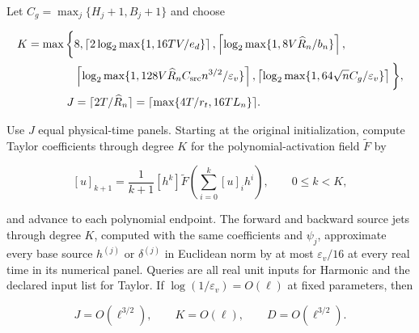 \begin{lemma}
\label{cp:init:source-routine}

Let $C_g=\max_j\{H_j+1,B_j+1\}$ and choose

\begin{equation}
\label{cp:init:eq:numerical-orders}
\begin{split}
K=\max\bigg\{&8,
 \left\lceil2\log_2\max\{1,16TV/e_d\}\right\rceil,
 \left\lceil\log_2\max\{1,8V\widehat R_n/b_n\}\right\rceil,\\
&\left\lceil\log_2\max\{1,128V\widehat R_nC_{\rm src}n^{3/2}/\varepsilon_v\}\right\rceil,
 \left\lceil\log_2\max\{1,64\sqrt nC_g/\varepsilon_v\}\right\rceil\bigg\},\\
J&=\lceil2T/\widehat R_n\rceil
 =\lceil\max\{4T/r_t,16TL_n\}\rceil.
\end{split}
\end{equation}

Use $J$ equal physical-time panels. Starting at the original initialization,
compute Taylor coefficients through degree $K$ for the polynomial-activation
field $\widetilde F$ by

\begin{equation}
\label{cp:init:eq:jet-recursion}
[u]_{k+1}=\frac1{k+1}[h^k]\widetilde F
                   \left(\sum_{i=0}^k[u]_ih^i\right),\qquad 0\le k<K,
\end{equation}

and advance to each polynomial endpoint. The forward and backward source
jets through degree $K$, computed with the same coefficients and
$\psi_j$, approximate every base source $h^{(j)}$ or
$\delta^{(j)}$ in Euclidean norm by at most $\varepsilon_v/16$
at every real time in its numerical panel. Queries are all real unit
inputs for Harmonic and the declared input list for Taylor.
If $\log(1/\varepsilon_v)=O(\ell)$ at fixed parameters, then

\begin{equation}
\label{cp:init:eq:numerical-scales}
J=O(\ell^{3/2}),\qquad K=O(\ell),\qquad D=O(\ell^{3/2}).
\end{equation}
\end{lemma}


